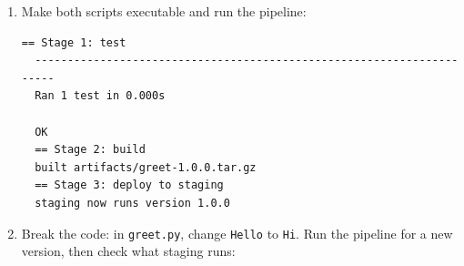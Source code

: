 \begin{enumerate}
\begin{codeblock}
\begin{Shaded}
\begin{Highlighting}[]
 
 
\end{Highlighting}
\end{Shaded}

  \end{codeblock}

  \texttt{set\ -euo\ pipefail} is the ``stop the line'' switch: the script exits at the first command that fails. \texttt{\$1} is the first argument, the version.
\item
  Make both scripts executable and run the pipeline:

  \begin{codeblock}

\begin{Shaded}
\begin{Highlighting}[]
\end{Highlighting}
\end{Shaded}

  \end{codeblock}

  \begin{codeblock}
  \begin{Verbatim}[formatcom=\outputstyle]
  == Stage 1: test
  ----------------------------------------------------------------------
  Ran 1 test in 0.000s

  OK
  == Stage 2: build
  built artifacts/greet-1.0.0.tar.gz
  == Stage 3: deploy to staging
  staging now runs version 1.0.0
  \end{Verbatim}
  \end{codeblock}
\item
  Break the code: in \texttt{greet.py}, change \texttt{Hello} to \texttt{Hi}. Run the pipeline for a new version, then check what staging runs:

  \begin{codeblock}

\begin{Shaded}
\begin{Highlighting}[]
\end{Highlighting}
\end{Shaded}

  \end{codeblock}


\end{enumerate}
